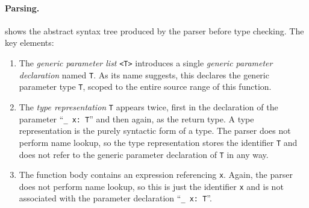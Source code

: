 \documentclass[../generics]{subfiles}
\begin{document}
\paragraph{Parsing.}  shows the abstract syntax tree produced by the parser before type checking. The key elements:
\begin{enumerate}
\item The \emph{generic parameter list} \texttt{<T>} introduces a single \emph{generic parameter declaration} named \texttt{T}. As its name suggests, this declares the generic parameter type \texttt{T}, scoped to the entire source range of this function.
\item The \emph{type representation} \texttt{T} appears twice, first in the declaration of the parameter ``\verb|_ x: T|'' and then again, as the return type. A type representation is the purely syntactic form of a type. The parser does not perform name lookup, so the type representation stores the identifier \texttt{T} and does not refer to the generic parameter declaration of \texttt{T} in any way.
\item The function body contains an expression referencing \texttt{x}. Again, the parser does not perform name lookup, so this is just the identifier \texttt{x} and is not associated with the parameter declaration ``\verb|_ x: T|''.
\end{enumerate}

\end{document}
